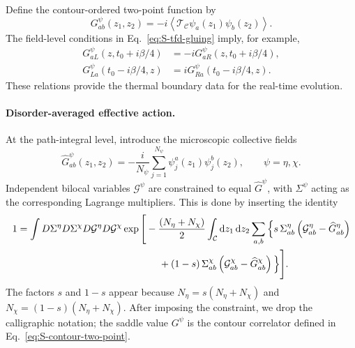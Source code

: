 \documentclass[11pt,a4paper]{article}
\begin{document}
Define the contour-ordered two-point function by
\begin{equation}
G^\psi_{ab}(z_1,z_2)
=
-i\left\langle
\mathcal T_{\mathcal C}
\psi_a(z_1)\psi_b(z_2)
\right\rangle .
\label{eq:S-contour-two-point}
\end{equation}
The field-level conditions in Eq.~\eqref{eq:S-tfd-gluing} imply, for example,
\begin{equation}
\begin{aligned}
G^\psi_{aL}(z,t_0+i\beta/4)
&=
-iG^\psi_{aR}(z,t_0+i\beta/4),
\\
G^\psi_{La}(t_0-i\beta/4,z)
&=
iG^\psi_{Ra}(t_0-i\beta/4,z).
\end{aligned}
\label{eq:S-two-point-gluing}
\end{equation}
These relations provide the thermal boundary data for the real-time
evolution.

\paragraph*{Disorder-averaged effective action.}

At the path-integral level, introduce the microscopic collective fields
\begin{equation}
\widehat G^\psi_{ab}(z_1,z_2)
=
-\frac{i}{N_\psi}
\sum_{j=1}^{N_\psi}
\psi^a_j(z_1)\psi^b_j(z_2),
\qquad
\psi=\eta,\chi .
\label{eq:S-bilocal-def}
\end{equation}
Independent bilocal variables \(\mathcal G^\psi\) are constrained to equal
\(\widehat G^\psi\), with \(\Sigma^\psi\) acting as the corresponding
Lagrange multipliers. This is done by inserting the identity
\begin{equation}
\label{eq:bilocal-constraint}
\begin{aligned}
1
&=
\int
D\Sigma^\eta D\Sigma^\chi
D\mathcal{G}^\eta D\mathcal{G}^\chi
\exp\Bigg[
-\frac{(N_\eta+N_\chi)}{2}
\int_{\mathcal{C}}\mathrm{d}z_1\,\mathrm{d}z_2
\sum_{a,b}
\Big\{
s\,\Sigma^\eta_{ab}
\left(
\mathcal{G}^\eta_{ab}
-
\widehat{G}^\eta_{ab}
\right)
\\
&\hspace{5.1cm}
+
(1-s)\,\Sigma^\chi_{ab}
\left(
\mathcal{G}^\chi_{ab}
-
\widehat{G}^\chi_{ab}
\right)
\Big\}
\Bigg].
\end{aligned}
\end{equation}
The factors \(s\) and \(1-s\) appear because
\(N_\eta=s(N_\eta+N_\chi)\) and \(N_\chi=(1-s)(N_\eta+N_\chi)\). After imposing the constraint, we drop the calligraphic
notation; the saddle value \(G^\psi\) is the contour correlator defined in
Eq.~\eqref{eq:S-contour-two-point}.
\end{document}
